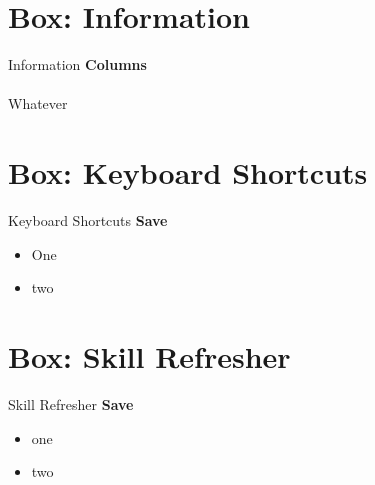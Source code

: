 \section{Box: Information}
\begin{center}
	\begin{infobox}{Information}
		\textbf{Columns}
		\\
		\\
		Whatever
	\end{infobox}
\end{center}

\section{Box: Keyboard Shortcuts}
\begin{center}
	\begin{shtcutbox}{Keyboard Shortcuts}
		\textbf{Save}
		\\
		\begin{itemize}
			\setlength{\itemsep}{0pt}
			\setlength{\parskip}{0pt}
			\setlength{\parsep}{0pt}
			
			\item One
			\item two
			
		\end{itemize}
	\end{shtcutbox}
\end{center}

\section{Box: Skill Refresher}
\begin{center}
	\begin{sklbox}{Skill Refresher}
		\textbf{Save}
		\\
		\begin{itemize}
			\setlength{\itemsep}{0pt}
			\setlength{\parskip}{0pt}
			\setlength{\parsep}{0pt}
			
			\item one
			\item two
			
		\end{itemize}
	\end{sklbox}
\end{center}

